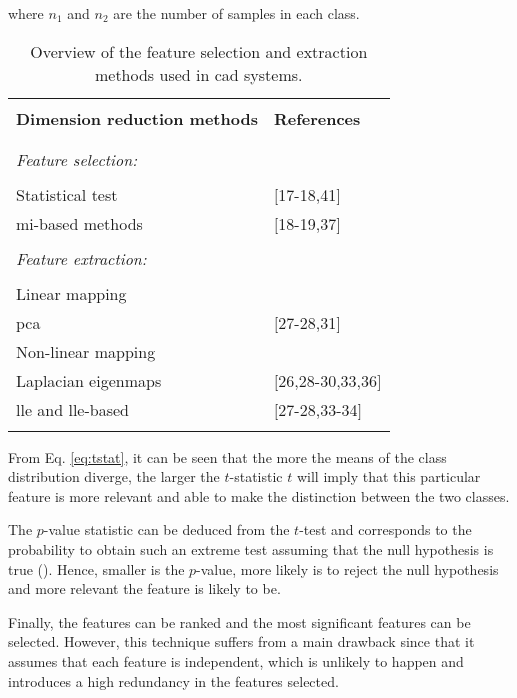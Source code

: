\noindent where $n_1$ and $n_2$ are the number of samples in each class.

\begin{table}
	\caption{Overview of the feature selection and extraction methods used in \ac{cad} systems.}
	\small
	\begin{tabular}{p{.65\linewidth} p{.25\linewidth}}
		\hline \\ [-1.5ex]
		\textbf{Dimension reduction methods} & \textbf{References} \\ \\ [-1.5ex]
		\hline \\ [-1.5ex]
		\textit{Feature selection:} & \\ \\ [-1.5ex]
		\quad Statistical test & $[$17-18,41$]$ \\
		\quad \ac{mi}-based methods & $[$18-19,37$]$ \\ \\ [-1.5ex]
		\textit{Feature extraction:} & \\ \\ [-1.5ex]
		\quad Linear mapping & \\
		\quad \quad \acs{pca} & $[$27-28,31$]$ \\
		\quad Non-linear mapping & \\
		\quad \quad Laplacian eigenmaps & $[$26,28-30,33,36$]$ \\
		\quad \quad \acs{lle} and \acs{lle}-based & $[$27-28,33-34$]$ \\ \\ [-1.5ex]
		\hline
	\end{tabular}
	\label{tab:featext}
\end{table}

From Eq. \eqref{eq:tstat}, it can be seen that the more the means of the class distribution diverge, the larger the $t$-statistic $t$ will imply that this particular feature is more relevant and able to make the distinction between the two classes. 

The $p$-value statistic can be deduced from the $t$-test and corresponds to the probability to obtain such an extreme test assuming that the null hypothesis is true (\cite{Goodman1999}). Hence, smaller is the $p$-value, more likely is to reject the null hypothesis and more relevant the feature is likely to be.

Finally, the features can be ranked and the most significant features can be selected. However, this technique suffers from a main drawback since that it assumes that each feature is independent, which is unlikely to happen and introduces a high redundancy in the features selected.

